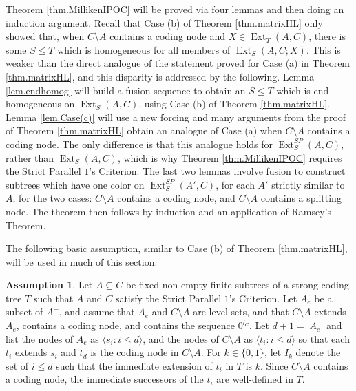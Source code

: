 \documentclass{amsart}
\theoremstyle{remark}
\theoremstyle{definition}
\newtheorem{assumption}[thm]{Assumption}
\theoremstyle{remark}
\newcommand{\sse}{\subseteq}
\DeclareMathOperator{\Ext}{Ext}
\newcommand{\lgl}{\langle}
\newcommand{\rgl}{\rangle}
\newcommand{\SPOC}{Strict Parallel $1$'s Criterion}
\begin{document}
 Theorem \ref{thm.MillikenIPOC} will be proved via four  lemmas and then doing an induction argument.
Recall that Case (b) of Theorem \ref{thm.matrixHL}  only showed that, when  $C\setminus A$ contains a coding node and $X\in\Ext_T(A,C)$,
there is some $S\le T$ which is homogeneous for all members of $\Ext_S(A,C;X)$.
This  is weaker than the direct analogue of
the statement proved for  Case (a) in
 Theorem \ref{thm.matrixHL},
and this  disparity is addressed by
the following.
 Lemma \ref{lem.endhomog} will build a fusion sequence to obtain an $S\le T$ which is end-homogeneous on $\Ext_S(A,C)$, using
 Case (b) of Theorem \ref{thm.matrixHL}.
Lemma \ref{lem.Case(c)} will use a new forcing and many arguments from the proof of Theorem \ref{thm.matrixHL}
obtain an analogue of Case (a) when $C\setminus  A$ contains a coding node.
The only difference is that this analogue holds for  $\Ext_S^{SP}(A,C)$, rather than $\Ext_S(A,C)$, which is why Theorem \ref{thm.MillikenIPOC} requires the \SPOC.
The last two lemmas involve fusion to construct subtrees which have one color on $\Ext^{SP}_S(A',C)$, for each $A'$ strictly similar to $A$, for the two cases: $C\setminus A$  contains a coding node, and $C\setminus A$ contains a splitting node.
The theorem then follows  by induction and an application of Ramsey's Theorem.




The following basic assumption, similar to  Case (b) of Theorem \ref{thm.matrixHL},  will be  used in much of this section.


\begin{assumption}\label{assumption.6}
Let $A\sse C$ be fixed non-empty finite subtrees of a strong coding tree $T$ such that $A$ and $C$ satisfy the \SPOC.
Let $A_e$ be a subset of $A^+$, and assume that $A_e$ and  $C\setminus A$ are level sets,
and that $C\setminus A$  extends $A_e$, contains a coding node, and contains the sequence $0^{l_C}$.
Let $d+1=|A_e|$ and list the nodes of $A_e$ as $\lgl s_i:i\le d\rgl$, and the nodes of $C\setminus A$ as $\lgl t_i:i\le d\rgl$ so that each $t_i$ extends $s_i$ and  $t_d$ is the coding node in $C\setminus A$.
For $k\in\{0,1\}$,
let
 $I_k$ denote the set of $i\le d$ such that the immediate extension  of $t_i$ in $T$ is $k$.
Since $C\setminus A$ contains a coding node, the immediate successors of the $t_i$ are well-defined in $T$.
\end{assumption}
\end{document}
